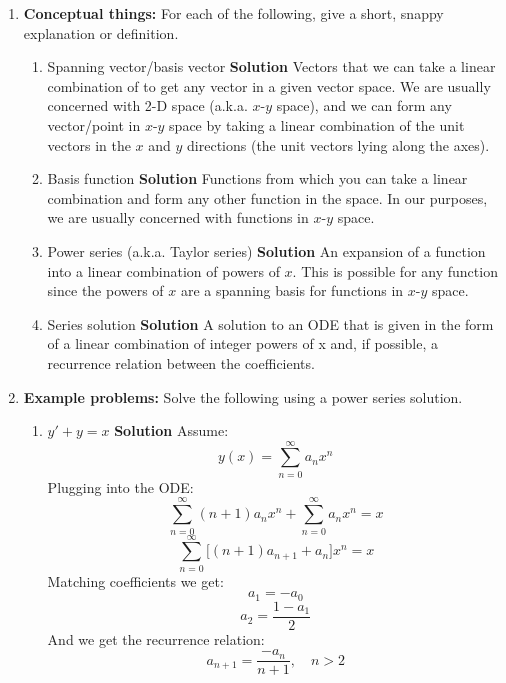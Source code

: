 \documentclass[letterpaper, fontsize=11pt]{scrartcl} %
\numberwithin{equation}{section} %
\numberwithin{figure}{section} %
\numberwithin{table}{section} %
\begin{document}
\begin{enumerate}
\item \textbf{Conceptual things:}  For each of the following, give a short, snappy explanation or definition.
\begin{enumerate}
\item Spanning vector/basis vector \newline
\textbf{Solution} Vectors that we can take a linear combination of to get any vector in a given vector space. We are usually concerned with 2-D space (a.k.a. $x$-$y$ space), and we can form any vector/point in $x$-$y$ space by taking a linear combination of the unit vectors in the $x$ and $y$ directions (the unit vectors lying along the axes). 

\item Basis function\newline
\textbf{Solution} Functions from which you can take a linear combination and form any other function in the space. In our purposes, we are usually concerned with functions in $x$-$y$ space.

\item Power series (a.k.a. Taylor series)\newline
\textbf{Solution} An expansion of a function into a linear combination of powers of $x$. This is possible for any function since the powers of $x$ are a spanning basis for functions in $x$-$y$ space.

\item Series solution\newline
\textbf{Solution} A solution to an ODE that is given in the form of a linear combination of integer powers of x and, if possible, a recurrence relation between the coefficients.

\end{enumerate}


\item \textbf{Example problems:}  Solve the following using a power series solution. 

\begin{enumerate}
\item $y' + y = x$ \newline
\textbf{Solution} \newline Assume:\newline
$$ y(x) =  \sum\limits_{n=0}^\infty a_n x^n$$
Plugging into the ODE:
$$\sum\limits_{n=0}^\infty (n+1) a_n x^n + \sum\limits_{n=0}^\infty a_n x^n = x$$
$$\sum\limits_{n=0}^\infty \big [ (n+1) a_{n+1} + a_n \big] x^n = x$$
Matching coefficients we get:
$$ a_1 = -a_0$$
$$ a_2 = \frac{1-a_1}{2}$$
And we get the recurrence relation:
$$a_{n+1} = \frac{-a_n}{n+1},\quad n > 2$$


\end{enumerate}
\end{enumerate}
\end{document}

